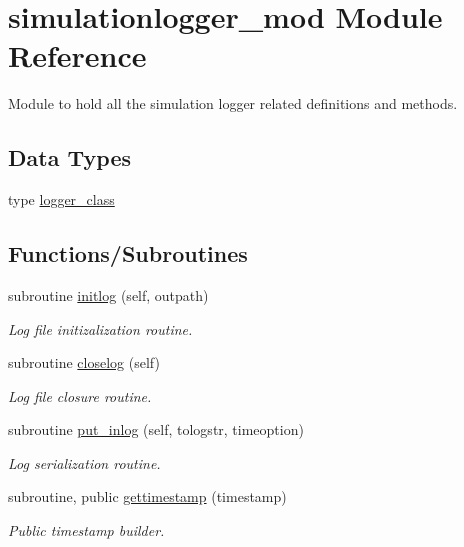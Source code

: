 \hypertarget{namespacesimulationlogger__mod}{}\section{simulationlogger\+\_\+mod Module Reference}
\label{namespacesimulationlogger__mod}


Module to hold all the simulation logger related definitions and methods.  


\subsection*{Data Types}
\begin{DoxyCompactItemize}
\item 
type \mbox{\hyperlink{structsimulationlogger__mod_1_1logger__class}{logger\+\_\+class}}
\end{DoxyCompactItemize}
\subsection*{Functions/\+Subroutines}
\begin{DoxyCompactItemize}
\item 
subroutine \mbox{\hyperlink{namespacesimulationlogger__mod_aeb57075501eed504789bb5858b4e6b59}{initlog}} (self, outpath)
\begin{DoxyCompactList}\small\item\em Log file initizalization routine. \end{DoxyCompactList}\item 
subroutine \mbox{\hyperlink{namespacesimulationlogger__mod_a9cad2fd4ad67dc229286f94b0444cb86}{closelog}} (self)
\begin{DoxyCompactList}\small\item\em Log file closure routine. \end{DoxyCompactList}\item 
subroutine \mbox{\hyperlink{namespacesimulationlogger__mod_a3bf437b875b454ef326a3bc660542539}{put\+\_\+inlog}} (self, tologstr, timeoption)
\begin{DoxyCompactList}\small\item\em Log serialization routine. \end{DoxyCompactList}\item 
subroutine, public \mbox{\hyperlink{namespacesimulationlogger__mod_abff1db7e1655cb59097146d78e650672}{gettimestamp}} (timestamp)
\begin{DoxyCompactList}\small\item\em Public timestamp builder. \end{DoxyCompactList}\end{DoxyCompactItemize}
